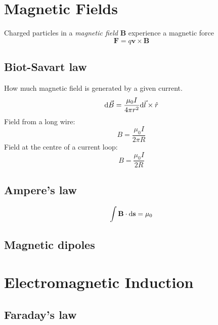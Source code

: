 \section{Magnetic Fields}
Charged particles in a \textit{magnetic field} $\mathbf{B}$ experience a magnetic force
\begin{equation*}
    \mathbf{F} = q\mathbf{v} \times \mathbf{B}
\end{equation*}
\subsection*{Biot-Savart law}
How much magnetic field is generated by a given current.
\begin{equation*}
    \differential \vec{B} = \frac{\mu_0 I}{4 \pi r^2} \differential \vec{l} \times \hat{r}
\end{equation*}
Field from a long wire:
\begin{equation*}
    B = \frac{\mu_0 I}{2\pi R}
\end{equation*}
Field at the centre of a current loop:
\begin{equation*}
    B = \frac{\mu_0 I}{2R}
\end{equation*}

\subsection*{Ampere's law}
\begin{equation*}
    \int \mathbf{B} \cdot \differential \mathbf{s} = \mu_0
\end{equation*}

\subsection*{Magnetic dipoles}

\section{Electromagnetic Induction}

\subsection*{Faraday's law}
